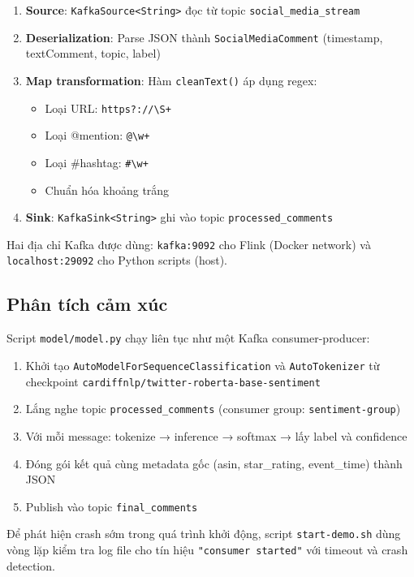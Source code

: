 \begin{enumerate}
    \item \textbf{Source}: \texttt{KafkaSource<String>} đọc từ topic \texttt{social\_media\_stream}
    \item \textbf{Deserialization}: Parse JSON thành \texttt{SocialMediaComment} (timestamp, textComment, topic, label)
    \item \textbf{Map transformation}: Hàm \texttt{cleanText()} áp dụng regex:
        \begin{itemize}
            \item Loại URL: \texttt{https?://\textbackslash S+}
            \item Loại @mention: \texttt{@\textbackslash w+}
            \item Loại \#hashtag: \texttt{\#\textbackslash w+}
            \item Chuẩn hóa khoảng trắng
        \end{itemize}
    \item \textbf{Sink}: \texttt{KafkaSink<String>} ghi vào topic \texttt{processed\_comments}
\end{enumerate}

Hai địa chỉ Kafka được dùng: \texttt{kafka:9092} cho Flink (Docker network) và \texttt{localhost:29092} cho Python scripts (host).

\subsection{Phân tích cảm xúc}

Script \texttt{model/model.py} chạy liên tục như một Kafka consumer-producer:

\begin{enumerate}
    \item Khởi tạo \texttt{AutoModelForSequenceClassification} và \texttt{AutoTokenizer} từ checkpoint \texttt{cardiffnlp/twitter-roberta-base-sentiment}
    \item Lắng nghe topic \texttt{processed\_comments} (consumer group: \texttt{sentiment-group})
    \item Với mỗi message: tokenize → inference → softmax → lấy label và confidence
    \item Đóng gói kết quả cùng metadata gốc (asin, star\_rating, event\_time) thành JSON
    \item Publish vào topic \texttt{final\_comments}
\end{enumerate}

Để phát hiện crash sớm trong quá trình khởi động, script \texttt{start-demo.sh} dùng vòng lặp kiểm tra log file cho tín hiệu \texttt{"consumer started"} với timeout và crash detection.

